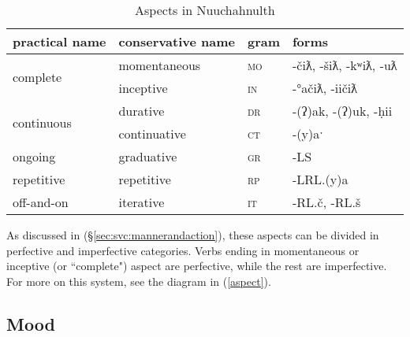 \begin{table}[ht]
\centering
\caption{Aspects in Nuuchahnulth}
\label{table:aspects}
\begin{tabular}{llll}
practical name                                    & conservative name                 & gram                    & forms                                                         \\ \hline
\multicolumn{1}{|l|}{\multirow{2}{*}{complete}}   & \multicolumn{1}{l|}{momentaneous} & \multicolumn{1}{l|}{\textsc{mo}} & \multicolumn{1}{l|}{-čiƛ, -šiƛ, -kʷiƛ, -uƛ}                 \\ \cline{2-4} 
\multicolumn{1}{|l|}{}                            & \multicolumn{1}{l|}{inceptive}    & \multicolumn{1}{l|}{\textsc{in}} & \multicolumn{1}{l|}{-°ačiƛ, -iičiƛ}                         \\ \hline
\multicolumn{1}{|l|}{\multirow{2}{*}{continuous}} & \multicolumn{1}{l|}{durative}     & \multicolumn{1}{l|}{\textsc{dr}} & \multicolumn{1}{l|}{-(ʔ)ak, -(ʔ)uk, -ḥii}                    \\ \cline{2-4} 
\multicolumn{1}{|l|}{}                            & \multicolumn{1}{l|}{continuative} & \multicolumn{1}{l|}{\textsc{ct}} & \multicolumn{1}{l|}{-(y)aˑ}                                   \\ \hline
\multicolumn{1}{|l|}{ongoing}                     & \multicolumn{1}{l|}{graduative}   & \multicolumn{1}{l|}{\textsc{gr}} & \multicolumn{1}{l|}{-LS}                        \\ \hline
\multicolumn{1}{|l|}{repetitive}                  & \multicolumn{1}{l|}{repetitive}   & \multicolumn{1}{l|}{\textsc{rp}} & \multicolumn{1}{l|}{-LRL.(y)a}                   \\ \hline
\multicolumn{1}{|l|}{off-and-on}                  & \multicolumn{1}{l|}{iterative}    & \multicolumn{1}{l|}{\textsc{it}} & \multicolumn{1}{l|}{-RL.č, -RL.š} \\ \hline
\end{tabular}
\end{table}

As discussed in (\S\ref{sec:svc:mannerandaction}), these aspects can be divided in perfective and imperfective categories. Verbs ending in momentaneous or inceptive (or ``complete") aspect are perfective, while the rest are imperfective. For more on this system, see the diagram in (\ref{aspect}).

\subsection{Mood}

